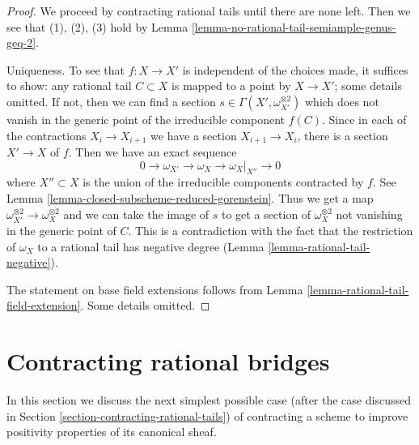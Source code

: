 \begin{proof}
We proceed by contracting rational tails until there are none
left. Then we see that (1), (2), (3) hold by
Lemma \ref{lemma-no-rational-tail-semiample-genus-geq-2}.

\medskip\noindent
Uniqueness. To see that $f : X \to X'$ is independent of the choices
made, it suffices to show: any rational tail $C \subset X$ is
mapped to a point by $X \to X'$; some details omitted.
If not, then we can find a section
$s \in \Gamma(X', \omega_{X'}^{\otimes 2})$ which does
not vanish in the generic point of the irreducible component $f(C)$.
Since in each of the contractions $X_i \to X_{i + 1}$
we have a section $X_{i + 1} \to X_i$, there is a section
$X' \to X$ of $f$. Then we have an exact sequence
$$
0 \to \omega_{X'} \to \omega_X \to \omega_X|_{X''} \to 0
$$
where $X'' \subset X$ is the union of the irreducible components
contracted by $f$. See Lemma \ref{lemma-closed-subscheme-reduced-gorenstein}.
Thus we get a map $\omega_{X'}^{\otimes 2} \to \omega_X^{\otimes 2}$
and we can take the image of $s$ to get a section of
$\omega_X^{\otimes 2}$ not vanishing in the generic point of $C$.
This is a contradiction with the fact that the restriction of
$\omega_X$ to a rational tail has negative degree
(Lemma \ref{lemma-rational-tail-negative}).

\medskip\noindent
The statement on base field extensions follows from
Lemma \ref{lemma-rational-tail-field-extension}. Some details omitted.
\end{proof}





\section{Contracting rational bridges}
\label{section-contracting-rational-bridges}

\noindent
In this section we discuss the next simplest possible case (after the case
discussed in Section \ref{section-contracting-rational-tails}) of contracting
a scheme to improve positivity properties of its canonical sheaf.


